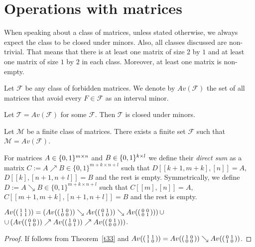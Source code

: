 \chapter{Operations with matrices}
\begin{ntn}
When speaking about a class of matrices, unless stated otherwise, we always expect the class to be closed under minors. Also, all classes discussed are non-trivial. That means that there is at least one matrix of size $2$ by $1$ and at least one matrix of size $1$ by $2$ in each class. Moreover, at least one matrix is non-empty.
\end{ntn}
\begin{defn}
Let $\mathcal{F}$ be any class of forbidden matrices. We denote by $Av(\mathcal{F})$ the set of all matrices that avoid every $F\in\mathcal{F}$ as an interval minor.
\end{defn}
\begin{obs}
Let $\mathcal{T}=Av(\mathcal{F})$ for some $\mathcal{F}$. Then $\mathcal{T}$ is closed under minors.
\end{obs}
\begin{obs}
Let $\mathcal{M}$ be a finite class of matrices. There exists a finite set $\mathcal{F}$ such that $\mathcal{M}=Av(\mathcal{F})$.
\end{obs}
\begin{defn}
For matrices $A\in\{0,1\}^{m\times n}$ and $B\in\{0,1\}^{k\times l}$ we define their \emph{direct sum} as a matrix $C:=A\nearrow B\in\{0,1\}^{m+k\times n+l}$ such that $D[[k+1,m+k],[n]]=A$, $D[[k],[n+1,n+l]]=B$ and the rest is empty. Symmetrically, we define $D:=A\searrow B\in\{0,1\}^{m+k\times n+l}$ such that $C[[m],[n]]=A$, $C[[m+1,m+k],[n+1,n+l]]=B$ and the rest is empty.
\end{defn}
\begin{thm}
$Av(\left(\begin{smallmatrix}1&1\\1&1\end{smallmatrix}\right))=\left(Av(\left(\begin{smallmatrix}1&0\\0&0\end{smallmatrix}\right))\searrow Av(\left(\begin{smallmatrix}0&1\\1&0\end{smallmatrix}\right))\searrow Av(\left(\begin{smallmatrix}0&0\\0&1\end{smallmatrix}\right))\right)\cup$\\
$\cup\left(Av(\left(\begin{smallmatrix}0&0\\1&0\end{smallmatrix}\right))\nearrow Av(\left(\begin{smallmatrix}1&0\\0&1\end{smallmatrix}\right))\nearrow Av(\left(\begin{smallmatrix}0&1\\0&0\end{smallmatrix}\right))\right)$.
\end{thm}
\begin{proof}
If follows from Theorem~\ref{t33} and $Av(\left(\begin{smallmatrix}1&1\\1&0\end{smallmatrix}\right))=Av(\left(\begin{smallmatrix}1&0\\0&0\end{smallmatrix}\right))\searrow Av(\left(\begin{smallmatrix}0&1\\1&0\end{smallmatrix}\right))$.
\end{proof}
